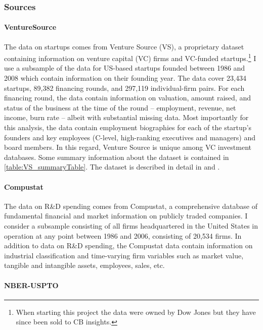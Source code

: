 \documentclass[11pt,english]{article}
\theoremstyle{remark}
\begin{document}
\subsubsection{Sources}

\paragraph{VentureSource}

The data on startups comes from Venture Source (VS), a proprietary dataset containing information on venture capital (VC) firms and VC-funded startups.\footnote{When starting this project the data were owned by Dow Jones but they have since been sold to CB insights.} I use a subsample of the data for US-based startups founded between 1986 and 2008 which contain information on their founding year. The data cover 23,434 startups, 89,382 financing rounds, and 297,119 individual-firm pairs. For each financing round, the data contain information on valuation, amount raised, and status of the business at the time of the round -- employment, revenue, net income, burn rate -- albeit with substantial missing data. Most importantly for this analysis, the data contain employment biographies for each of the startup's founders and key employees (C-level, high-ranking executives and managers) and board members. In this regard, Venture Source is unique among VC investment databases. Some summary information about the dataset is contained in \autoref{table:VS_summaryTable}. The dataset is described in detail in \cite{kaplan_how_2002} and \cite{kaplan_venture_2016}. 

\paragraph{Compustat}

The data on R\&D spending comes from Compustat, a comprehensive database of fundamental financial and market information on publicly traded companies. I consider a subsample consisting of all firms headquartered in the United States in operation at any point between 1986 and 2006, consisting of 20,534 firms. In addition to data on R\&D spending, the Compustat data contain information on industrial classification and time-varying firm variables such as market value, tangible and intangible assets, employees, sales, etc.

\paragraph{NBER-USPTO}
\end{document}
